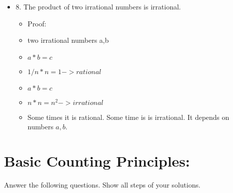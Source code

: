 \documentclass[11pt]{article}
\begin{document}
\begin{itemize}
\item 8. The product of two irrational numbers is irrational.
\begin{itemize}
\item Proof:
\item two irrational numbers a,b
\item $a * b = c$
\item $1/n * n = 1 -> rational$
\item  $a * b = c$ 
\item $n*n = n^2 -> irrational$
\item Some times it is rational. Some time is is irrational. It depends on numbers $a,b$. 
\end{itemize} 

\end{itemize} 




\section{Basic Counting Principles:}

Answer the following questions. Show all steps of your solutions.
\end{document}
